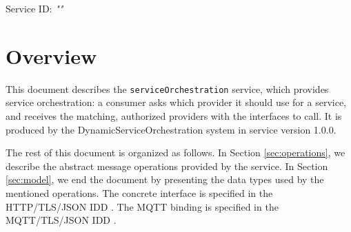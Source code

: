 \documentclass[a4paper]{arrowhead}
\begin{document}
\sloppy

\ArrowheadSetup

\begin{center}
  \vspace*{1cm}
  \huge{\arrowtitle}

  \vspace*{0.2cm}
  \LARGE{\arrowtype}
  \vspace*{1cm}

  \Large{Service ID: \textit{"\arrowid"}}

  \vspace*{\fill}


  \vspace*{1cm}
  \vspace*{\fill}

  \begin{abstract}
    This document describes the \texttt{service\allowbreak{}Orchestration} service, version 1.0.0, produced by the DynamicServiceOrchestration core system of Arrowhead 5.2.2.
  \end{abstract}

  \vspace*{1cm}
\end{center}

\newpage

\tableofcontents
\newpage

\section{Overview}
\label{sec:overview}

This document describes the \texttt{service\allowbreak{}Orchestration} service, which provides service orchestration: a consumer asks which provider it should use for a service, and receives the matching, authorized providers with the interfaces to call.
It is produced by the DynamicServiceOrchestration system \cite{dso-sysd} in service version 1.0.0.

The rest of this document is organized as follows.
In Section \ref{sec:operations}, we describe the abstract message operations provided by the service.
In Section \ref{sec:model}, we end the document by presenting the data types used by the mentioned operations.
The concrete interface is specified in the HTTP/TLS/JSON IDD \cite{dso-serviceOrchestration-http-idd}. The MQTT binding is specified in the MQTT/TLS/JSON IDD \cite{dso-serviceOrchestration-mqtt-idd}.
\end{document}

